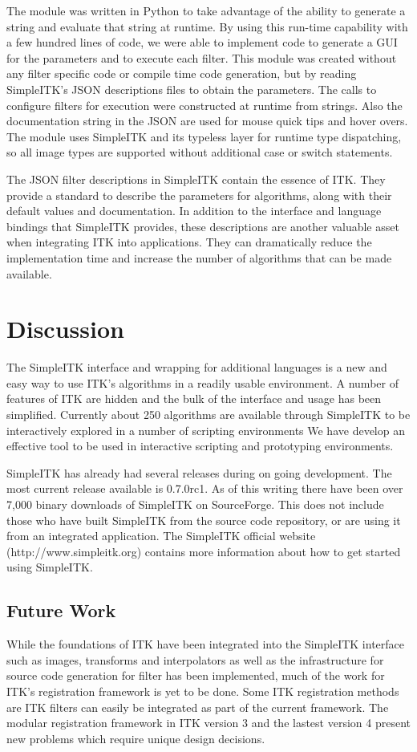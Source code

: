 \documentclass{frontiersMED} %
\begin{document}
The module was written in Python to take advantage of the ability
to generate a string and evaluate that string at runtime.
By using this run-time capability with a few hundred lines of
code, we were able to implement code to generate a GUI for the
parameters and to execute each filter. This module was created without any
filter specific code or compile time code generation, but by
reading SimpleITK’s JSON descriptions files to obtain the
parameters. The calls to configure filters for execution were
constructed at runtime from strings. Also the documentation
string in the JSON are used for mouse quick tips and hover overs. The
module uses SimpleITK and its typeless layer for runtime type
dispatching, so all image types are supported without additional case
or switch statements.

The JSON filter descriptions in SimpleITK contain the essence of
ITK. They provide a standard to describe the parameters for
algorithms, along with their default values and documentation. In
addition to the interface and language bindings that SimpleITK provides,
these descriptions are another valuable asset when integrating ITK into
applications.  They can dramatically reduce the implementation time and
increase the number of algorithms that can be made available.

\section{Discussion}
The SimpleITK interface and wrapping for additional languages is a new
and easy way to use ITK’s algorithms in a readily usable
environment. A number of features of ITK are hidden and the bulk of
the interface and usage has been simplified. Currently about 250
algorithms are available through SimpleITK to be interactively
explored in a number of scripting environments We have develop an
effective tool to be used in interactive scripting and prototyping
environments.

SimpleITK has already had several releases during on going
development. The most current release available is 0.7.0rc1. As of
this writing there have been over 7,000 binary downloads of SimpleITK
on SourceForge. This does not include those who have built SimpleITK
from the source code repository, or are using it from an integrated
application. The SimpleITK official website (http://www.simpleitk.org)
contains more information about how to get started using SimpleITK.

\subsection{Future Work}
While the foundations of ITK have been integrated into the SimpleITK
interface such as images, transforms and interpolators as well as the
infrastructure for source code generation for filter has been
implemented, much of the work for ITK’s registration framework is yet
to be done. Some ITK registration methods are ITK filters can easily
be integrated as part of the current framework. The modular
registration framework in ITK version 3 and the lastest version 4
present new problems which require unique design decisions.
\end{document}
